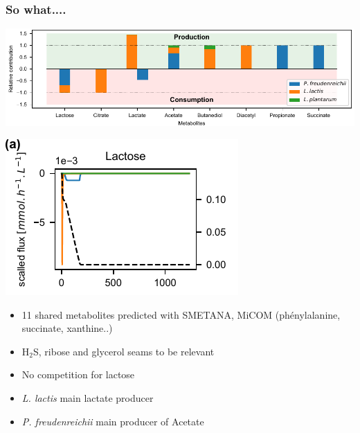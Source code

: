 \documentclass[8pt]{beamer}
\begin{document}
\begin{frame}
\frametitle{So what....}
\includegraphics[width=\textwidth]{figures/relative-contribution.pdf}
\begin{minipage}{0.5\textwidth}
\includegraphics[width=\textwidth]{figures/lactose.pdf}
\end{minipage}%
\begin{minipage}{0.5\textwidth}
\begin{itemize}
\item 11 shared metabolites predicted with SMETANA, MiCOM (phénylalanine, succinate, xanthine..)
\item H$_2$S, ribose and glycerol seams to be relevant
\end{itemize}
\end{minipage}

\begin{itemize}
\item No competition for lactose
\item \textit{L. lactis} main lactate producer 
\item \textit{P. freudenreichii} main producer of Acetate
\end{itemize}
\end{frame}
\end{document}
